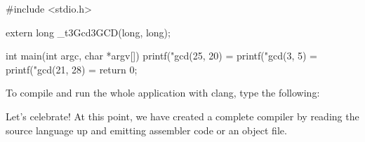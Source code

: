 \begin{cpp}
#include <stdio.h>

extern long _t3Gcd3GCD(long, long);

int main(int argc, char *argv[]) {
    printf("gcd(25, 20) = %
    printf("gcd(3, 5) = %
    printf("gcd(21, 28) = %
    return 0;
}
\end{cpp}

To compile and run the whole application with clang, type the following:


Let’s celebrate! At this point, we have created a complete compiler by reading the source language up and emitting assembler code or an object file.


















